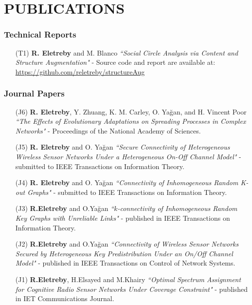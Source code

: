 \documentclass[letterpaper,11pt]{article}
\begin{document}
\section{PUBLICATIONS}

\subsubsection*{\quad \large Technical Reports}
\begin{itemize}
\item[(T1)] \textbf{R. Eletreby} and  M. Blanco \textit{``Social Circle Analysis via Content and Structure Augmentation"} - Source code and report are available at: \url{https://github.com/reletreby/structureAug}
\end{itemize}

\subsubsection*{\quad \large Journal Papers}
\begin{itemize}
\item[(J6)] \textbf{R. Eletreby}, Y. Zhuang, K. M. Carley, O. Ya\u{g}an, and H.  Vincent Poor \textit{``The Effects of Evolutionary Adaptations on Spreading Processes in Complex Networks"} - Proceedings of the National Academy of Sciences.

\item[(J5)] \textbf{R. Eletreby} and O. Ya\u{g}an \textit{``Secure Connectivity of Heterogeneous Wireless Sensor Networks Under a Heterogeneous On-Off Channel Model"} - submitted to IEEE Transactions on Information Theory.

\item[(J4)] \textbf{R. Eletreby} and O. Ya\u{g}an \textit{``Connectivity of Inhomogeneous Random K-out Graphs"} - submitted to IEEE Transactions on Information Theory.

\item[(J3)] \textbf{R.Eletreby} and O.Ya\u{g}an \textit{``$k$-connectivity of Inhomogeneous Random Key Graphs with Unreliable Links"} - published in IEEE Transactions on Information Theory.

\item[(J2)] \textbf{R.Eletreby} and O.Ya\u{g}an \textit{``Connectivity of Wireless Sensor Networks Secured by Heterogeneous Key Predistribution Under an On/Off Channel Model"} - published in IEEE Transactions on Control of Network Systems.

\item[(J1)] \textbf{R.Eletreby}, H.Elsayed and M.Khairy \textit{``Optimal Spectrum Assignment for Cognitive Radio Sensor Networks Under Coverage Constraint"} - published in IET Communications Journal.
\end{itemize}
\end{document}
